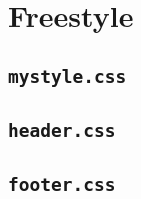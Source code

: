 \section{Freestyle}

\subsection{\texttt{mystyle.css}}
 

\newpage
\subsection{\texttt{header.css}}
 

\newpage
\subsection{\texttt{footer.css}}
 